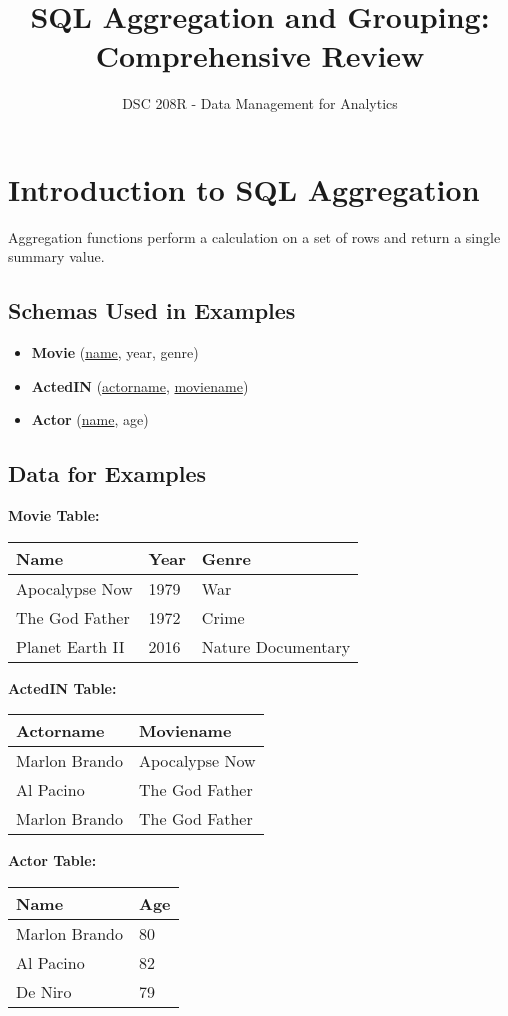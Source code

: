 \documentclass{article}
\title{SQL Aggregation and Grouping: Comprehensive Review}
\author{DSC 208R - Data Management for Analytics}
\date{}
\begin{document}
\maketitle

\section*{Introduction to SQL Aggregation}
Aggregation functions perform a calculation on a set of rows and return a single summary value.

\subsection*{Schemas Used in Examples}
\begin{itemize}
    \item \textbf{Movie} (\underline{name}, year, genre) 
    \item \textbf{ActedIN} (\underline{actorname}, \underline{moviename}) 
    \item \textbf{Actor} (\underline{name}, age) 
\end{itemize}

\subsection*{Data for Examples}
\textbf{Movie Table:} 
\begin{tabular}{|l|l|l|}
    \hline
    \textbf{Name} & \textbf{Year} & \textbf{Genre} \\
    \hline
    Apocalypse Now & 1979 & War \\
    The God Father & 1972 & Crime \\
    Planet Earth II & 2016 & Nature Documentary \\
    \hline
\end{tabular}

\textbf{ActedIN Table:} 
\begin{tabular}{|l|l|}
    \hline
    \textbf{Actorname} & \textbf{Moviename} \\
    \hline
    Marlon Brando & Apocalypse Now \\
    Al Pacino & The God Father \\
    Marlon Brando & The God Father \\
    \hline
\end{tabular}

\textbf{Actor Table:} 
\begin{tabular}{|l|l|}
    \hline
    \textbf{Name} & \textbf{Age} \\
    \hline
    Marlon Brando & 80 \\
    Al Pacino & 82 \\
    De Niro & 79 \\
    \hline
\end{tabular}
\end{document}
